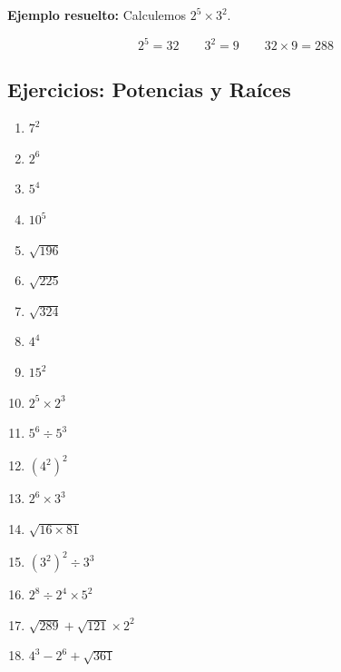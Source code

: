 \documentclass[12pt, letterpaper]{article}
\begin{document}
\noindent\textbf{Ejemplo resuelto:} Calculemos $2^5 \times 3^2$.

$$2^5 = 32 \qquad 3^2 = 9 \qquad 32 \times 9 = 288$$

\subsection{Ejercicios: Potencias y Raíces}

\begin{enumerate}[leftmargin=*]
  \item \facil{} $7^2$

  \item \facil{} $2^6$

  \item \facil{} $5^4$

  \item \facil{} $10^5$

  \item \facil{} $\sqrt{196}$

  \item \facil{} $\sqrt{225}$

  \item \medio{} $\sqrt{324}$

  \item \medio{} $4^4$

  \item \medio{} $15^2$

  \item \medio{} $2^5 \times 2^3$

  \item \medio{} $5^6 \div 5^3$

  \item \medio{} $(4^2)^2$

  \item \dificil{} $2^6 \times 3^3$

  \item \dificil{} $\sqrt{16 \times 81}$

  \item \dificil{} $(3^2)^2 \div 3^3$

  \item \dificil{} $2^8 \div 2^4 \times 5^2$

  \item \dificil{} $\sqrt{289} + \sqrt{121} \times 2^2$

  \item \dificil{} $4^3 - 2^6 + \sqrt{361}$
\end{enumerate}
\end{document}
